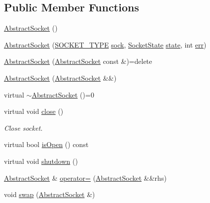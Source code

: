 \subsection*{Public Member Functions}
\begin{DoxyCompactItemize}
\item 
\hyperlink{classlog4cplus_1_1helpers_1_1AbstractSocket_a3048fe0149fe01c7f6379d56620d3c14}{Abstract\-Socket} ()
\item 
\hyperlink{classlog4cplus_1_1helpers_1_1AbstractSocket_acdad9b60968270ce55f9655777274bb8}{Abstract\-Socket} (\hyperlink{namespacelog4cplus_1_1helpers_afe2a1567866b6a9e0bfd5d425c3323f2}{S\-O\-C\-K\-E\-T\-\_\-\-T\-Y\-P\-E} \hyperlink{classlog4cplus_1_1helpers_1_1AbstractSocket_af94ee3bfaba254e722bdd55429b61393}{sock}, \hyperlink{namespacelog4cplus_1_1helpers_ac57a089674b66ea982e43dff7ff1c78e}{Socket\-State} \hyperlink{classlog4cplus_1_1helpers_1_1AbstractSocket_a145f2db82d4ab080a5e114606b79b4c9}{state}, int \hyperlink{classlog4cplus_1_1helpers_1_1AbstractSocket_a26ff3fef10b1f1a6e50d41e78141bb4c}{err})
\item 
\hyperlink{classlog4cplus_1_1helpers_1_1AbstractSocket_af3471e109d67098cb86b685a178f5994}{Abstract\-Socket} (\hyperlink{classlog4cplus_1_1helpers_1_1AbstractSocket}{Abstract\-Socket} const \&)=delete
\item 
\hyperlink{classlog4cplus_1_1helpers_1_1AbstractSocket_ad192086b263a1995b0740d124308eb56}{Abstract\-Socket} (\hyperlink{classlog4cplus_1_1helpers_1_1AbstractSocket}{Abstract\-Socket} \&\&)
\item 
virtual \hyperlink{classlog4cplus_1_1helpers_1_1AbstractSocket_a6bf4d9f07de52942a9c1ee8e473e6b08}{$\sim$\-Abstract\-Socket} ()=0
\item 
virtual void \hyperlink{classlog4cplus_1_1helpers_1_1AbstractSocket_a00702db0ebd54d3f38217c886a64f254}{close} ()
\begin{DoxyCompactList}\small\item\em Close socket. \end{DoxyCompactList}\item 
virtual bool \hyperlink{classlog4cplus_1_1helpers_1_1AbstractSocket_acd16bfd7bdac18d7c55e4e28c393e391}{is\-Open} () const 
\item 
virtual void \hyperlink{classlog4cplus_1_1helpers_1_1AbstractSocket_a3ba8350f8dd1b5fdc479b46860628304}{shutdown} ()
\item 
\hyperlink{classlog4cplus_1_1helpers_1_1AbstractSocket}{Abstract\-Socket} \& \hyperlink{classlog4cplus_1_1helpers_1_1AbstractSocket_ad2336b79f4219abde75f25061ef4afba}{operator=} (\hyperlink{classlog4cplus_1_1helpers_1_1AbstractSocket}{Abstract\-Socket} \&\&rhs)
\item 
void \hyperlink{classlog4cplus_1_1helpers_1_1AbstractSocket_a58e92b132e50f9b7c67e945b442c0551}{swap} (\hyperlink{classlog4cplus_1_1helpers_1_1AbstractSocket}{Abstract\-Socket} \&)
\end{DoxyCompactItemize}
